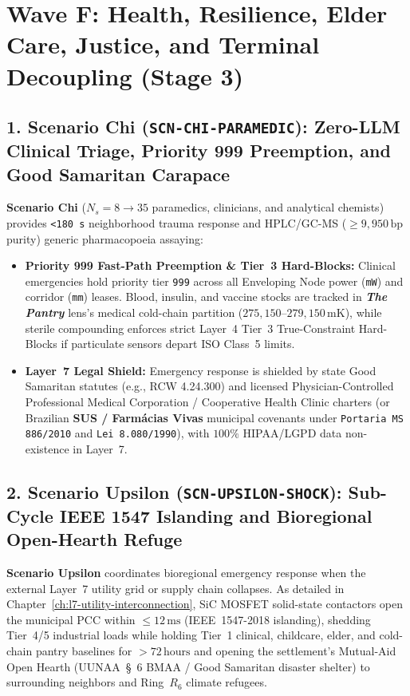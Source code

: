 \section{Wave F: Health, Resilience, Elder Care, Justice, and Terminal Decoupling (Stage 3)}
\label{sec:l7-wave-f}

\subsection{1. Scenario Chi (\texttt{SCN-CHI-PARAMEDIC}): Zero-LLM Clinical Triage, Priority 999 Preemption, and Good Samaritan Carapace}
\textbf{Scenario Chi} ($N_s = 8 \to 35$ paramedics, clinicians, and analytical chemists) provides \texttt{<180 s} neighborhood trauma response and HPLC/GC-MS ($\ge 9{,}950\,\mathrm{bp}$ purity) generic pharmacopoeia assaying:
\begin{itemize}
    \item \textbf{Priority 999 Fast-Path Preemption \& Tier~3 Hard-Blocks:} Clinical emergencies hold priority tier \texttt{999} across all Enveloping Node power (\texttt{mW}) and corridor (\texttt{mm}) leases. Blood, insulin, and vaccine stocks are tracked in \textbf{\textit{The Pantry}} lens's medical cold-chain partition ($275{,}150\text{--}279{,}150\,\mathrm{mK}$), while sterile compounding enforces strict Layer~4 Tier~3 True-Constraint Hard-Blocks if particulate sensors depart ISO Class~5 limits.
    \item \textbf{Layer~7 Legal Shield:} Emergency response is shielded by state Good Samaritan statutes (e.g., RCW 4.24.300) and licensed Physician-Controlled Professional Medical Corporation / Cooperative Health Clinic charters (or Brazilian \textbf{SUS / Farm{\'a}cias Vivas} municipal covenants under \texttt{Portaria MS 886/2010} and \texttt{Lei 8.080/1990}), with $100\%$ HIPAA/LGPD data non-existence in Layer~7.
\end{itemize}

\subsection{2. Scenario Upsilon (\texttt{SCN-UPSILON-SHOCK}): Sub-Cycle IEEE 1547 Islanding and Bioregional Open-Hearth Refuge}
\textbf{Scenario Upsilon} coordinates bioregional emergency response when the external Layer~7 utility grid or supply chain collapses. As detailed in Chapter~\ref{ch:l7-utility-interconnection}, SiC MOSFET solid-state contactors open the municipal PCC within $\le 12\,\mathrm{ms}$ (IEEE~1547-2018 islanding), shedding Tier~4/5 industrial loads while holding Tier~1 clinical, childcare, elder, and cold-chain pantry baselines for $>72\,\mathrm{hours}$ and opening the settlement's Mutual-Aid Open Hearth (UUNAA~\S~6 BMAA / Good Samaritan disaster shelter) to surrounding neighbors and Ring~$R_6$ climate refugees.

